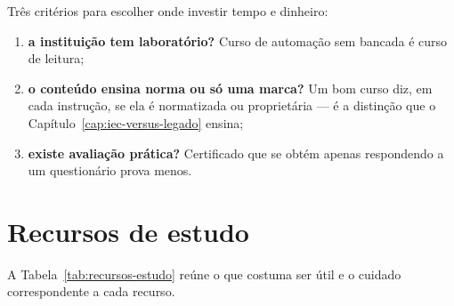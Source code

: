 Três critérios para escolher onde investir tempo e dinheiro:

\begin{enumerate}
  \item \textbf{a instituição tem laboratório?} Curso de automação sem bancada é curso de leitura;
  \item \textbf{o conteúdo ensina norma ou só uma marca?} Um bom curso diz, em cada instrução, se ela
        é normatizada ou proprietária --- é a distinção que o Capítulo~\ref{cap:iec-versus-legado}
        ensina;
  \item \textbf{existe avaliação prática?} Certificado que se obtém apenas respondendo a um
        questionário prova menos.
\end{enumerate}

\section{Recursos de estudo}

A Tabela~\ref{tab:recursos-estudo} reúne o que costuma ser útil e o cuidado correspondente a cada
recurso.

